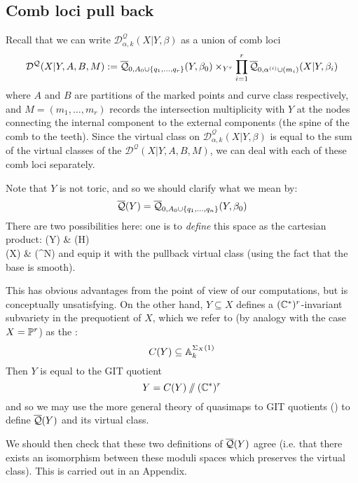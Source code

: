 \subsection{Comb loci pull back} \label{Subsection comb loci pull back}
Recall that we can write $\mathcal D^\mathcal{Q}_{\alpha,k}(X|Y,\beta)$ as a union of comb loci
\begin{equation*} \mathcal D^{\mathcal{Q}}(X|Y,A,B,M) := \overline{\mathcal Q}_{0,A_0 \cup \{q_1, \ldots, q_r\}}(Y,\beta_0) \times_{Y^r} \prod_{i=1}^r \overline{\mathcal Q}_{0,\alpha^{(i)}\cup (m_i)}(X|Y,\beta_i) \end{equation*}
where $A$ and $B$ are partitions of the marked points and curve class respectively, and $M=(m_1,\ldots,m_r)$ records the intersection multiplicity with $Y$ at the nodes connecting the internal component to the external components (the spine of the comb to the teeth). Since the virtual class on $\mathcal D^\mathcal{Q}_{\alpha,k}(X|Y,\beta)$ is equal to the sum of the virtual classes of the $\mathcal D^{\mathcal{Q}}(X|Y,A,B,M)$, we can deal with each of these comb loci separately.


\begin{remark} \label{GIT comparison remark} Note that $Y$ is not toric, and so we should clarify what we mean by:
\begin{equation*} \overline{\mathcal{Q}}(Y) = \overline{\mathcal Q}_{0,A_0 \cup \{ q_1, \ldots, q_n \}}(Y,\beta_0) \end{equation*}
There are two possibilities here: one is to \emph{define} this space as the cartesian product:
\bcd
{}(Y) \ar[r] \ar[d]  & (H) \ar[d] \\
(X) \ar[r] & (\PP^N)
\ecd
and equip it with the pullback virtual class (using the fact that the base is smooth).

This has obvious advantages from the point of view of our computations, but is conceptually unsatisfying. On the other hand, $Y \subseteq X$ defines a $(\mathbb{C}^*)^r$-invariant subvariety in the prequotient of $X$, which we refer to (by analogy with the case $X=\mathbb P^r$) as the :
\begin{equation*} C(Y) \subseteq \mathbb{A}_k^{\Sigma_X(1)} \end{equation*}
Then $Y$ is equal to the GIT quotient
\begin{equation*} Y = C(Y) \sslash (\mathbb{C}^*)^r \end{equation*}
and so we may use the more general theory of quasimaps to GIT quotients (\cite{CFKM}) to define $\overline{\mathcal{Q}}(Y)$ and its virtual class.

We should then check that these two definitions of $\overline{\mathcal{Q}}(Y)$ agree (i.e. that there exists an isomorphism between these moduli spaces which preserves the virtual class). This is carried out in an Appendix.
\end{remark}


